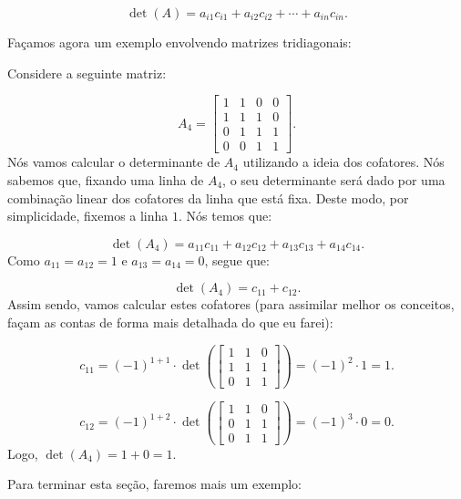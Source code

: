 $$
\det(A) = a_{i1}c_{i1} + a_{i2}c_{i2} + \cdots + a_{in}c_{in}.
$$

Façamos agora um exemplo envolvendo matrizes tridiagonais:

\begin{Example}
	Considere a seguinte matriz:
	
	$$
	A_4 = \begin{bmatrix}
		1 & 1 & 0 & 0 \\
		1 & 1 & 1 & 0 \\
		0 & 1 & 1 & 1 \\
		0 & 0 & 1 & 1
	\end{bmatrix}.
	$$
	Nós vamos calcular o determinante de $A_4$ utilizando a ideia dos cofatores. Nós sabemos que, fixando uma linha de $A_4$, o seu determinante será dado por uma combinação linear dos cofatores da linha que está fixa. Deste modo, por simplicidade, fixemos a linha $1$. Nós temos que:
	
	$$
	\det(A_4) = a_{11}c_{11} + a_{12}c_{12} + a_{13}c_{13} + a_{14}c_{14}.
	$$
	Como $a_{11} = a_{12} = 1$ e $a_{13} = a_{14} = 0$, segue que:
	
	$$
	\det(A_4) = c_{11} + c_{12}.
	$$
	Assim sendo, vamos calcular estes cofatores (para assimilar melhor os conceitos, façam as contas de forma mais detalhada do que eu farei):
	
	$$
	c_{11} = (-1)^{1 + 1}\cdot\det\left(\begin{bmatrix}
		1 & 1 & 0 \\
		1 & 1 & 1 \\
		0 & 1 & 1
	\end{bmatrix}\right) = (-1)^2\cdot 1 = 1.
	$$
	
	$$
	c_{12} = (-1)^{1 + 2}\cdot\det\left(\begin{bmatrix}
		1 & 1 & 0 \\
		0 & 1 & 1 \\
		0 & 1 & 1
	\end{bmatrix}\right) = (-1)^3\cdot 0 = 0.
	$$
	Logo, $\det(A_4) = 1 + 0 = 1$.
\end{Example}

Para terminar esta seção, faremos mais um exemplo:

